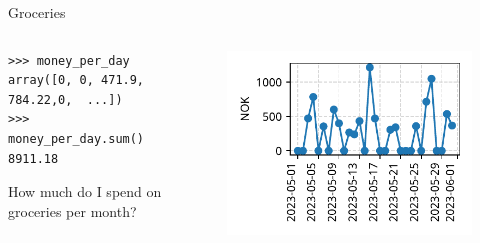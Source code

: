 \documentclass[12pt, aspectratio=149]{beamer}
\theoremstyle{plain}
\begin{document}
\begin{frame}[fragile]{Groceries}
\begin{columns}
\begin{column}{0.50\textwidth}
    \begin{center}
     \begin{verbatim} 
>>> money_per_day
array([0, 0, 471.9, 784.22,0,  ...])
>>> money_per_day.sum()
8911.18
     \end{verbatim}
     \vspace*{2em}
     How much do I spend on\\groceries per month?
     \end{center}	
\end{column}
\begin{column}{0.50\textwidth}  %
    \begin{center}
     \begin{figure}
     	\centering
     	\includegraphics[width=0.99\linewidth]{figures/groceries_data}
     \end{figure}
     \end{center}
\end{column}
\end{columns}
\end{frame}
\end{document}
